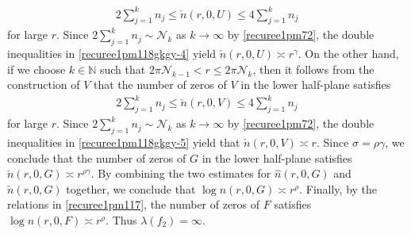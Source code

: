 \documentclass[12pt]{amsart}
\numberwithin{equation}{section}
\begin{document}
\begin{equation}\label{recuree1pm118gkgy-4}
\begin{split}
2\sum_{j=1}^{k}n_j \leq \check{n}(r,0,U)\leq 4\sum_{j=1}^{k}n_j
\end{split}
\end{equation}
for large $r$. Since $2\sum_{j=1}^{k}n_j\sim \mathcal{N}_k$ as $k\to\infty$ by \eqref{recuree1pm72}, the double inequalities in \eqref{recuree1pm118gkgy-4} yield $\check{n}(r,0,U)\asymp r^{\gamma}$. On the other hand, if we choose $k\in \mathbb{N}$ such that $2\pi\mathcal{N}_{k-1} <r \leq 2\pi \mathcal{N}_k$, then it follows from the construction of $V$ that the number of zeros of $V$ in the lower half-plane satisfies
\begin{equation}\label{recuree1pm118gkgy-5}
\begin{split}
2\sum_{j=1}^{k}n_j \leq \check{n}(r,0,V)\leq 4\sum_{j=1}^{k}n_j
\end{split}
\end{equation}
for large $r$. Since $2\sum_{j=1}^{k}n_j\sim \mathcal{N}_k$ as $k\to\infty$ by \eqref{recuree1pm72}, the double inequalities in \eqref{recuree1pm118gkgy-5} yield that $\check{n}(r,0,V)\asymp r$. Since $\sigma=\rho\gamma$, we conclude that the number of zeros of $G$ in the lower half-plane satisfies $\check{n}(r,0,G)\asymp r^{\rho\gamma}$. By combining the two estimates for $\hat{n}(r,0,G)$ and $\check{n}(r,0,G)$ together, we conclude that $\log n(r,0,G)\asymp r^{\rho}$. Finally, by the relations in \eqref{recuree1pm117}, the number of zeros of $F$ satisfies $\log n(r,0,F)\asymp r^{\rho}$. Thus $\lambda(f_2)=\infty$.
\end{document}
